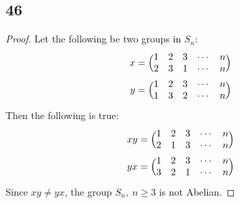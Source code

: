\documentclass{article}
\begin{document}
\subsection*{46}
\begin{proof}
Let the following be two groups in $S_n$:
\begin{align*}
	x &= \Bigl(\begin{matrix}
		1 & 2 & 3 & \cdots & n\\
		2 & 3 & 1 & \cdots & n\\
	\end{matrix}\Bigr)\\
	y &= \Bigl(\begin{matrix}
		1 & 2 & 3 & \cdots & n\\
		1 & 3 & 2 & \cdots & n\\
	\end{matrix}\Bigr)\\
\end{align*}
Then the following is true:
\begin{align*}
	xy &= \Bigl(\begin{matrix}
		1 & 2 & 3 & \cdots & n\\
		2 & 1 & 3 & \cdots & n\\
	\end{matrix}\Bigr)\\
	yx &= \Bigl(\begin{matrix}
		1 & 2 & 3 & \cdots & n\\
		3 & 2 & 1 & \cdots & n\\
	\end{matrix}\Bigr)\\
\end{align*}
Since $xy \neq yx$, the group $S_n,\ n \ge 3$ is not Abelian.
\end{proof}
\end{document}
